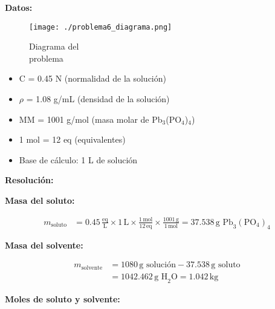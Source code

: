 \documentclass{article}
\begin{document}
\begin{multicols}{2} %
\noindent\textbf{Datos:} %

\begin{figure}[H]
    \begin{minipage}[t]{0.3\textwidth} %
        \raggedright %
        \texttt{[image: ./problema6\_diagrama.png]} %
        \caption{Diagrama del \\ problema}
    \end{minipage}
\end{figure}

\textbf{} %
\begin{itemize}
\item C = 0.45 N (normalidad de la solución)
\item $\rho$ = 1.08 g/mL (densidad de la solución)
\item MM = 1001 g/mol (masa molar de Pb$_3$(PO$_4$)$_4$)
\item 1 mol = 12 eq (equivalentes)
\item Base de cálculo: 1 L de solución
\end{itemize}

\columnbreak %

\noindent\textbf{Resolución:} %

\textbf{Masa del soluto:}

\begin{align*}
    m_{\text{soluto}} &= 0.45 \, \frac{\text{eq}}{\text{L}} \times 1 \, \text{L} \times \frac{1 \, \text{mol}}{12 \, \text{eq}} \times \frac{1001 \, \text{g}}{1 \, \text{mol}} = 37.538 \, \text{g Pb}_3(\text{PO}_4)_4
\end{align*}

\textbf{Masa del solvente:}

\begin{align*}
    m_{\text{solvente}} &= 1080 \, \text{g solución} - 37.538 \, \text{g soluto} \\
    &= 1042.462 \, \text{g H}_2\text{O} = 1.042 \, \text{kg}
\end{align*}

\textbf{Moles de soluto y solvente:}


\end{multicols}
\end{document}
